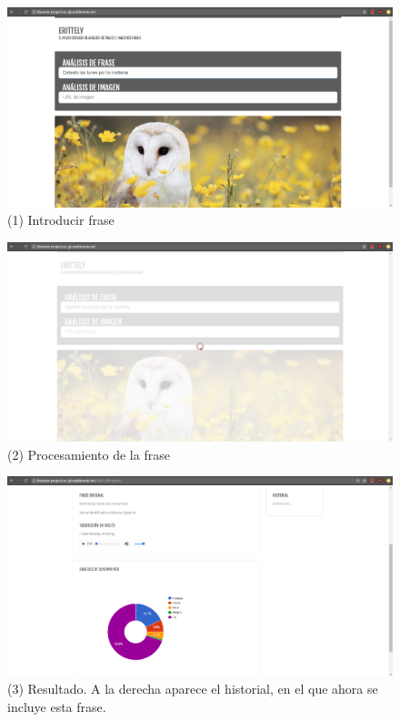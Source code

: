 \documentclass[a4paper]{article}
\begin{document}
\begin{figure}[htp!]
    \centering
    \caption{(1) Introducir frase}
    \label{fig:5}
    \includegraphics[width=\textwidth]{a}
\end{figure}
\begin{figure}[htp!]
    \centering
    \caption{(2) Procesamiento de la frase}
    \label{fig:6}
    \includegraphics[width=\textwidth]{b}
\end{figure}
\begin{figure}[htp!]
    \centering
    \caption{(3) Resultado. A la derecha aparece el historial, en el que ahora se incluye esta frase.}
    \label{fig:7}
    \includegraphics[width=\textwidth]{c}
\end{figure}
\end{document}
